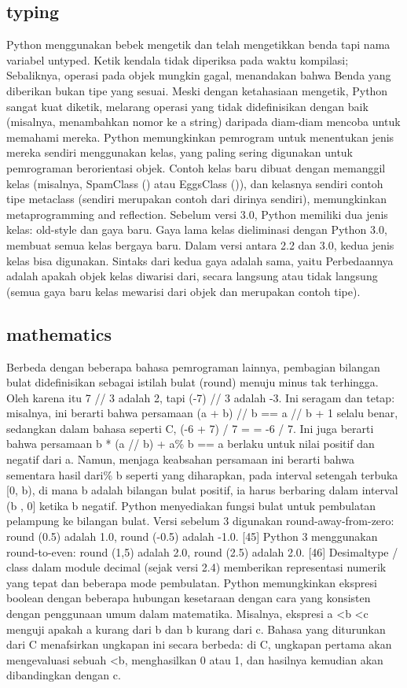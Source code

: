 \subsection {typing}
	Python menggunakan bebek mengetik dan telah mengetikkan benda tapi nama variabel untyped. Ketik kendala tidak diperiksa pada waktu kompilasi; Sebaliknya, operasi pada objek mungkin gagal, menandakan bahwa
	Benda yang diberikan bukan tipe yang sesuai. Meski dengan ketahasiaan mengetik, Python sangat kuat diketik, melarang operasi yang tidak didefinisikan dengan baik (misalnya, menambahkan nomor ke a
	string) daripada diam-diam mencoba untuk memahami mereka. Python memungkinkan pemrogram untuk menentukan jenis mereka sendiri menggunakan kelas, yang paling sering
	digunakan untuk pemrograman berorientasi objek. Contoh kelas baru dibuat dengan memanggil kelas (misalnya, SpamClass () atau EggsClass ()), dan kelasnya sendiri
	contoh tipe metaclass (sendiri merupakan contoh dari dirinya sendiri), memungkinkan metaprogramming and reflection. Sebelum versi 3.0, Python memiliki dua jenis kelas: old-style dan gaya baru. Gaya lama
	kelas dieliminasi dengan Python 3.0, membuat semua kelas bergaya baru. Dalam versi antara 2.2 dan 3.0, kedua jenis kelas bisa digunakan. Sintaks dari kedua gaya adalah sama, yaitu
	Perbedaannya adalah apakah objek kelas diwarisi dari, secara langsung atau tidak langsung (semua gaya baru kelas mewarisi dari objek dan merupakan contoh tipe).
      
\subsection {mathematics}
	Berbeda dengan beberapa bahasa pemrograman lainnya, pembagian bilangan bulat didefinisikan sebagai istilah bulat (round) menuju minus tak terhingga. 
	Oleh karena itu 7 // 3 adalah 2, tapi (-7) // 3 adalah -3. Ini seragam dan tetap: misalnya, ini berarti bahwa persamaan (a + b) // b == a // b + 1 selalu benar, 
	sedangkan dalam bahasa seperti C, (-6 + 7) / 7 = = -6 / 7. Ini juga berarti bahwa persamaan b * (a // b) + a\% b == a berlaku untuk nilai positif dan negatif dari a. Namun, menjaga keabsahan persamaan ini berarti bahwa sementara hasil dari\% b seperti yang diharapkan, pada interval setengah terbuka [0, b), di mana b adalah bilangan bulat positif, 
	ia harus berbaring dalam interval (b , 0] ketika b negatif.
	Python menyediakan fungsi bulat untuk pembulatan pelampung ke bilangan bulat. Versi sebelum 3 digunakan round-away-from-zero: round (0.5) adalah 1.0, round (-0.5) adalah -1.0. [45] Python 3 menggunakan round-to-even: round (1,5) adalah 2.0, round (2.5) adalah 2.0. [46] Desimaltype / class dalam module decimal (sejak versi 2.4) memberikan representasi numerik yang tepat dan beberapa mode pembulatan.
	Python memungkinkan ekspresi boolean dengan beberapa hubungan kesetaraan dengan cara yang konsisten dengan penggunaan umum dalam matematika. Misalnya, ekspresi a <b <c menguji apakah a kurang dari b dan b kurang dari c. Bahasa yang diturunkan dari C menafsirkan ungkapan ini secara berbeda: di C, ungkapan pertama akan mengevaluasi sebuah <b, menghasilkan 0 atau 1, dan hasilnya kemudian akan dibandingkan dengan c.

